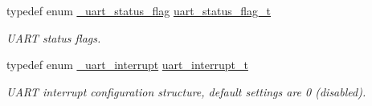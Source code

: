 \begin{DoxyCompactItemize}
typedef enum \hyperlink{group__uart__hal_gaa4ec9f908b1b8e958c99ddff14373882}{\+\_\+uart\+\_\+status\+\_\+flag} \hyperlink{group__uart__hal_gab5a3fa1c858501bdf99d5f46bdb18672}{uart\+\_\+status\+\_\+flag\+\_\+t}
\begin{DoxyCompactList}\small\item\em U\+A\+RT status flags. \end{DoxyCompactList}\item 
typedef enum \hyperlink{group__uart__hal_ga0241bd5ddb8629625e7facd8da941fd9}{\+\_\+uart\+\_\+interrupt} \hyperlink{group__uart__hal_ga8e2791d1785e2c0036663b1e1be51a14}{uart\+\_\+interrupt\+\_\+t}
\begin{DoxyCompactList}\small\item\em U\+A\+RT interrupt configuration structure, default settings are 0 (disabled). \end{DoxyCompactList}\end{DoxyCompactItemize}
